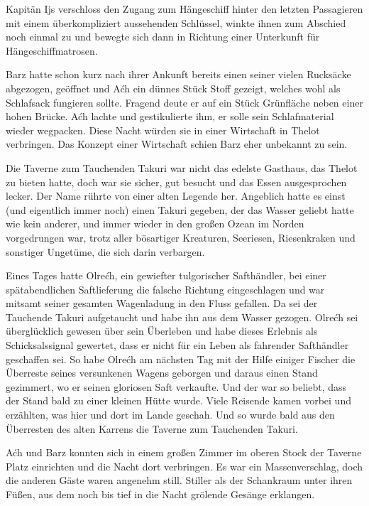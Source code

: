 Kapitän Ijs verschloss den Zugang zum Hängeschiff hinter den letzten Passagieren mit einem überkompliziert aussehenden Schlüssel, winkte ihnen zum Abschied noch einmal zu und bewegte sich dann in Richtung einer Unterkunft für Hängeschiffmatrosen.

Barz hatte schon kurz nach ihrer Ankunft bereits einen seiner vielen Rucksäcke abgezogen, geöffnet und Aćh ein dünnes Stück Stoff gezeigt, welches wohl als Schlafsack fungieren sollte. Fragend deute er auf ein Stück Grünfläche neben einer hohen Brücke. Aćh lachte und gestikulierte ihm, er solle sein Schlafmaterial wieder wegpacken. Diese Nacht würden sie in einer Wirtschaft in Thelot verbringen. Das Konzept einer Wirtschaft schien Barz eher unbekannt zu sein.

Die Taverne zum Tauchenden Takuri war nicht das edelste Gasthaus, das Thelot zu bieten hatte, doch war sie sicher, gut besucht und das Essen ausgesprochen lecker. Der Name rührte von einer alten Legende her. Angeblich hatte es einst (und eigentlich immer noch) einen Takuri gegeben, der das Wasser geliebt hatte wie kein anderer, und immer wieder in den großen Ozean im Norden vorgedrungen war, trotz aller bösartiger Kreaturen, Seeriesen, Riesenkraken und sonstiger Ungetüme, die sich darin verbargen.

Eines Tages hatte Olrećh, ein gewiefter tulgorischer Safthändler, bei einer spätabendlichen Saftlieferung die falsche Richtung eingeschlagen und war mitsamt seiner gesamten Wagenladung in den Fluss gefallen. Da sei der Tauchende Takuri aufgetaucht und habe ihn aus dem Wasser gezogen. Olrećh sei überglücklich gewesen über sein Überleben und habe dieses Erlebnis als Schicksalssignal gewertet, dass er nicht für ein Leben als fahrender Safthändler geschaffen sei. So habe Olrećh am nächsten Tag mit der Hilfe einiger Fischer die Überreste seines versunkenen Wagens geborgen und daraus einen Stand gezimmert, wo er seinen gloriosen Saft verkaufte. Und der war so beliebt, dass der Stand bald zu einer kleinen Hütte wurde. Viele Reisende kamen vorbei und erzählten, was hier und dort im Lande geschah. Und so wurde bald aus den Überresten des alten Karrens die Taverne zum Tauchenden Takuri.\bigskip







Aćh und Barz konnten sich in einem großen Zimmer im oberen Stock der Taverne Platz einrichten und die Nacht dort verbringen. Es war ein Massenverschlag, doch die anderen Gäste waren angenehm still. Stiller als der Schankraum unter ihren Füßen, aus dem noch bis tief in die Nacht grölende Gesänge erklangen.

